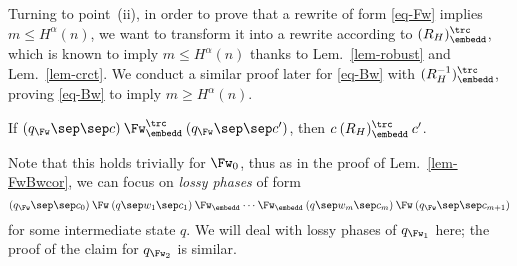 Turning to point~(ii), in order to prove that a rewrite of
form \eqref{eq-Fw} implies $m\leq H^\alpha(n)$, we want to transform
it into a rewrite according to $(R_H)_\embedd^\trc$, which is known to
imply $m\leq H^\alpha(n)$ thanks to Lem.~\ref{lem-robust} and
Lem.~\ref{lem-crct}.  We conduct a similar proof later
for \eqref{eq-Bw} with $(R_H^{-1})_\embedd^\trc$,
proving \eqref{eq-Bw} to imply $m\geq H^\alpha(n)$.
\begin{claim}
  If $(q_\Fw\sep\sep c)\mathbin{\Fw_\embedd^\trc}(q_\Fw\sep\sep c')$, then
  $c\mathbin{(R_H)_\embedd^\trc}c'$.
\end{claim}
Note that this holds trivially for $\Fw_0$, thus as in the proof of
Lem.~\ref{lem-FwBwcor}, we can focus on \emph{lossy phases} of form
\begin{equation}\label{eq-lphase}
  (q_\Fw\sep\sep c_0)\mathbin{\Fw}(q\sep w_1\sep
  c_1)\mathbin{\Fw_\embedd}\cdots\mathbin{\Fw_\embedd}(q\sep w_m\sep
  c_{m})\mathbin{\Fw}(q_\Fw\sep\sep c_{m+1})
\end{equation}
for some intermediate state $q$.  We will deal with lossy phases of
$q_{\Fw_1}$ here; the proof of the claim for $q_{\Fw_2}$ is similar.
